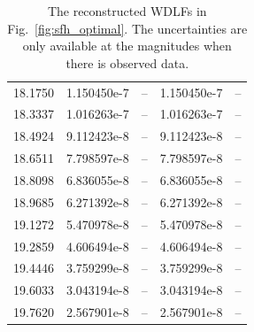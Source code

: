 \documentclass[fleqn,usenatbib]{mnras}
\begin{document}
\begin{table}
\begin{tabular}{c|cccc}
18.1750 & 1.150450e-7 & -- & 1.150450e-7 & --\\
18.3337 & 1.016263e-7 & -- & 1.016263e-7 & --\\\hline
18.4924 & 9.112423e-8 & -- & 9.112423e-8 & --\\
18.6511 & 7.798597e-8 & -- & 7.798597e-8 & --\\
18.8098 & 6.836055e-8 & -- & 6.836055e-8 & --\\
18.9685 & 6.271392e-8 & -- & 6.271392e-8 & --\\
19.1272 & 5.470978e-8 & -- & 5.470978e-8 & --\\
19.2859 & 4.606494e-8 & -- & 4.606494e-8 & --\\
19.4446 & 3.759299e-8 & -- & 3.759299e-8 & --\\
19.6033 & 3.043194e-8 & -- & 3.043194e-8 & --\\
19.7620 & 2.567901e-8 & -- & 2.567901e-8 & --\\\hline
    \end{tabular}
    \caption{The reconstructed WDLFs in Fig.~\ref{fig:sfh_optimal}. The uncertainties are only available at the magnitudes when there is observed data.}
    \label{tab:my_label}
\end{table}

\bsp	%
\label{lastpage}
\end{document}
